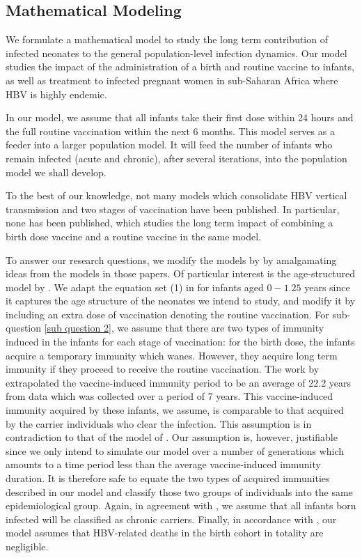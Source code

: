 \subsection{Mathematical Modeling}
We formulate a mathematical model to study the long term contribution of infected neonates to the general population-level infection dynamics. Our model studies the  impact of the administration of a birth and routine vaccine to infants, as well as treatment to infected pregnant women in sub-Saharan Africa where HBV is highly endemic.  

In our model, we assume that all infants take their first dose within 24 hours and the full routine vaccination within the next 6 months. This model serves as a feeder into a larger population model. It will feed the number of infants who remain infected (acute and chronic),  after several iterations, into the population model we shall develop.

To the best of our knowledge, not many models which consolidate HBV vertical transmission and two stages of vaccination have been published. In particular, none has been published, which studies the long term impact of combining a birth dose vaccine and a routine vaccine in the same model. 

To answer our research questions, we modify the models by \cite{mann2011modelling_NewZealand,zou2010modeling} by amalgamating ideas from the models in those papers. Of particular interest is the age-structured model by \cite{mann2011modelling_NewZealand}. We adapt the equation set (1) in \cite{mann2011modelling_NewZealand} for infants aged $0-1.25$ years since it captures the age structure of the neonates we intend to study, and modify it by including an extra dose of vaccination denoting the routine vaccination. For sub-question \ref{sub question 2}, we assume that there are two types of immunity induced in the infants for each stage of vaccination: for the birth dose, the infants acquire a temporary immunity which wanes. However, they acquire long term immunity if they proceed to receive the routine vaccination. The work by \cite{mclean1994modelling} extrapolated the vaccine-induced immunity period to be an average of 22.2 years from data which was collected over a period of 7 years. This vaccine-induced immunity acquired by these infants, we assume, is comparable to that acquired by the carrier individuals who clear the infection. This assumption is in contradiction to that of the model of \cite{zou2010modeling}. Our assumption is, however, justifiable since we only intend to simulate our model over a number of generations which amounts to a time period less than the average vaccine-induced immunity duration. It is therefore safe to equate the two types of acquired immunities described in our model and classify those two groups of individuals into the same epidemiological group. Again, in agreement with \cite{zhang2012analysisHBVmodel}, we assume that all infants born infected will be classified as chronic carriers. Finally, in accordance with \cite{mann2011modelling_NewZealand}, our model assumes that HBV-related deaths in the birth cohort in totality are negligible.

